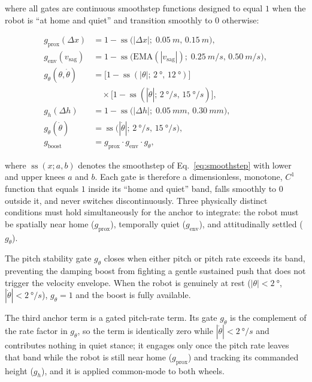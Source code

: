 \documentclass[a4paper,fleqn]{cas-dc}
\begin{document}
where all gates are continuous smoothstep functions designed to equal $1$ when the robot is ``at home and quiet'' and transition smoothly to $0$ otherwise:

\begin{align}
g_{\text{prox}}(\Delta x) &= 1 - \operatorname{ss}\bigl(|\Delta x|;\;\SI{0.05}{m},\,\SI{0.15}{m}\bigr),
\label{eq:g_prox}\\[2pt]
g_{\text{env}}(v_{\text{sag}}) &= 1 - \operatorname{ss}\bigl(\mathrm{EMA}(|v_{\text{sag}}|);\;\SI{0.25}{m/s},\,\SI{0.50}{m/s}\bigr),
\label{eq:g_env}\\[2pt]
g_\theta(\theta,\dot{\theta}) &= \bigl[1 - \operatorname{ss}(|\theta|;\,\SI{2}{\degree},\,\SI{12}{\degree})\bigr] \nonumber\\
&\quad\times \bigl[1 - \operatorname{ss}(|\dot{\theta}|;\,\SI{2}{\degree/s},\,\SI{15}{\degree/s})\bigr],
\label{eq:g_theta}\\[2pt]
g_h(\Delta h) &= 1 - \operatorname{ss}\bigl(|\Delta h|;\;\SI{0.05}{mm},\,\SI{0.30}{mm}\bigr),
\label{eq:g_h}\\[2pt]
g_{\dot{\theta}}(\dot{\theta}) &= \operatorname{ss}\bigl(|\dot{\theta}|;\,\SI{2}{\degree/s},\,\SI{15}{\degree/s}\bigr),
\label{eq:g_thetadot}\\[2pt]
g_{\text{boost}} &= g_{\text{prox}}\cdot g_{\text{env}}\cdot g_\theta,
\label{eq:g_boost}
\end{align}

where $\operatorname{ss}(x;a,b)$ denotes the smoothstep of Eq.~\eqref{eq:smoothstep} with lower and upper knees $a$ and $b$.
Each gate is therefore a dimensionless, monotone, $C^1$ function that equals $1$ inside its ``home and quiet'' band, falls smoothly to $0$ outside it, and never switches discontinuously.
Three physically distinct conditions must hold simultaneously for the anchor to integrate: the robot must be spatially near home ($g_{\text{prox}}$), temporally quiet ($g_{\text{env}}$), and attitudinally settled ($g_\theta$).

The pitch stability gate $g_\theta$ closes when either pitch or pitch rate exceeds its band, preventing the damping boost from fighting a gentle sustained push that does not trigger the velocity envelope.
When the robot is genuinely at rest ($|\theta|<\SI{2}{\degree}$, $|\dot{\theta}|<\SI{2}{\degree/s}$), $g_\theta=1$ and the boost is fully available.

The third anchor term is a gated pitch-rate term. Its gate $g_{\dot{\theta}}$ is the complement of the rate factor in $g_\theta$, so the term is identically zero while $|\dot{\theta}|<\SI{2}{\degree/s}$ and contributes nothing in quiet stance; it engages only once the pitch rate leaves that band while the robot is still near home ($g_{\text{prox}}$) and tracking its commanded height ($g_h$), and it is applied common-mode to both wheels.
\end{document}
